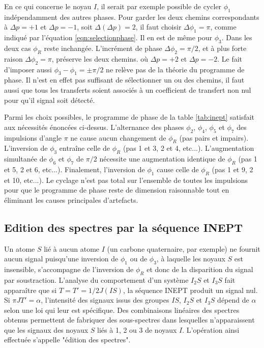 En ce qui concerne le noyau $I$, il serait par exemple possible
de cycler $\phi_1$ indépendamment des autres phases.
Pour garder les deux chemins correspondants à $\Delta p = +1$ et
$\Delta p = -1$, soit $\Delta(\Delta p) = 2$, il faut choisir
$\Delta \phi_1 = \pi$, comme indiqué par l'équation \ref{eqn:selectionphase}.
Il en est de même pour $\phi_3$.
Dans les deux cas $\phi_R$ reste inchangée.
L'incrément de phase $\Delta \phi_2 = \pi/2$, et à 
plus forte raison $\Delta \phi_2 = \pi$, préserve les deux chemins.
où $\Delta p = +2$ et $\Delta p = -2$.
Le fait d'imposer aussi $\phi_3 - \phi_1 = \pm \pi/2$ ne relève pas 
de la théorie du programme de phase.
Il n'est en effet pas suffisant de sélectionner un ou des chemins,
il faut aussi que tous les transferts soient associés à un coefficient
de transfert non nul pour qu'il signal soit détecté.

Parmi les choix possibles, le programme de phase de la table \ref{tab:inept}
satisfait aux nécessités énoncées ci-dessus.
L'alternance des phases $\phi_2$, $\phi_4$, $\phi_5$ et $\phi_7$ des impulsions
d'angle $\pi$ ne cause aucun changement de $\phi_R$ (pas pairs et impairs).
L'inversion de $\phi_3$ entraîne celle de $\phi_R$ (pas 1 et 3, 2 et 4, etc...).
L'augmentation simultanée de $\phi_6$ et $\phi_7$ de $\pi/2$ nécessite
une augmentation identique de $\phi_R$ (pas 1 et 5, 2 et 6, etc...).
Finalement, l'inversion de $\phi_1$ cause celle de $\phi_R$ (pas 1 et 9, 2 et 10, etc...).
Le cyclage n'est pas total sur l'ensemble de toutes les impulsions pour
que le programme de phase reste de dimension raisonnable
tout en éliminant les causes principales d'artefacts.

\subsection{Edition des spectres par la séquence INEPT}
Un atome $S$ lié à aucun atome $I$ (un carbone quaternaire, par exemple)
ne fournit aucun signal puisqu'une inversion de $\phi_1$ ou de $\phi_3$,
à laquelle les noyaux $S$ est insensible, s'accompagne de l'inversion de
$\phi_R$ et donc de la disparition du signal par soustraction.
L'analyse du comportement d'un système $I_2S$ et $I_3S$ fait apparaître que
si $T = T' = 1/2J(IS)$, la séquence INEPT produit un signal nul.
Si $\pi J T' = \alpha$, l'intensité des signaux 
issus des groupes $IS$, $I_2S$ et $I_3S$ dépend de $\alpha$ selon une
loi qui leur est spécifique.
Des combinaisons linéaires des spectres obtenus permettent de fabriquer
des sous-spectres dans lesquelles n'apparaissent que les signaux
des noyaux $S$ liés à 1, 2 ou 3 de noyaux $I$.
L'opération ainsi effectuée s'appelle "édition des spectres".

